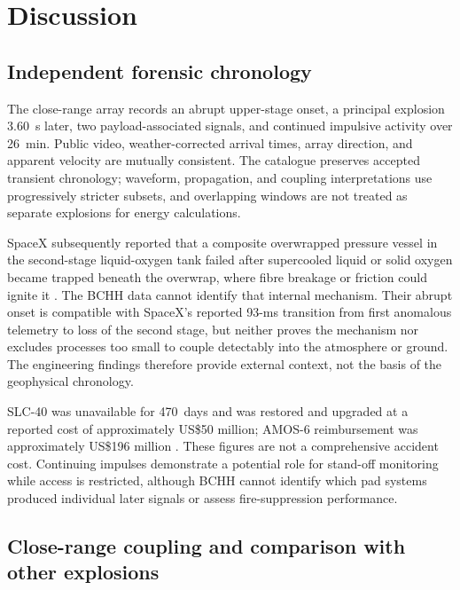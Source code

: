 \documentclass[]{seismica}
\begin{document}
\FloatBarrier

\section{Discussion}
\label{sec:discussion}

\subsection{Independent forensic chronology}

The close-range array records an abrupt upper-stage onset, a principal
explosion 3.60~s later, two payload-associated signals, and continued
impulsive activity over 26~min. Public video, weather-corrected arrival times,
array direction, and apparent velocity are mutually consistent. The catalogue
preserves accepted transient chronology; waveform, propagation, and coupling
interpretations use progressively stricter subsets, and overlapping windows
are not treated as separate explosions for energy calculations.

SpaceX subsequently reported that a composite overwrapped pressure vessel in
the second-stage liquid-oxygen tank failed after supercooled liquid or solid
oxygen became trapped beneath the overwrap, where fibre breakage or friction
could ignite it \citep{spacex_anomaly_2017,nasa_sma_falcon9}. The BCHH data
cannot identify that internal mechanism. Their abrupt onset is compatible with
SpaceX's reported 93-ms transition from first anomalous telemetry to loss of
the second stage, but neither proves the mechanism nor excludes processes too
small to couple detectably into the atmosphere or ground. The engineering
findings therefore provide external context, not the basis of the geophysical
chronology.

SLC-40 was unavailable for 470~days and was restored and upgraded at a reported
cost of approximately US\$50 million; AMOS-6 reimbursement was approximately
US\$196 million \citep{clark_slc40_2017,magan_amos6_2016,
spacex_crs13_2017}. These figures are not a comprehensive accident cost.
Continuing impulses demonstrate a potential role for stand-off monitoring
while access is restricted, although BCHH cannot identify which pad systems
produced individual later signals or assess fire-suppression performance.

\subsection{Close-range coupling and comparison with other explosions}
\end{document}
